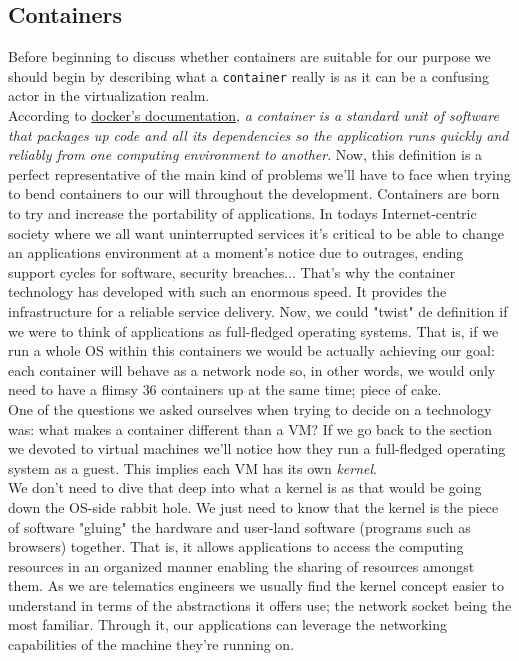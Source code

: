         \subsection{Containers}
            Before beginning to discuss whether containers are suitable for our purpose we should begin by describing what a \texttt{container} really is as it can be a confusing actor in the virtualization realm.\\

            According to \href{https://www.docker.com/resources/what-container}{docker's documentation}, \textit{a container is a standard unit of software that packages up code and all its dependencies so the application runs quickly and reliably from one computing environment to another}. Now, this definition is a perfect representative of the main kind of problems we'll have to face when trying to bend containers to our will throughout the development. Containers are born to try and increase the portability of applications. In todays Internet-centric society where we all want uninterrupted services it's critical to be able to change an applications environment at a moment's notice due to outrages, ending support cycles for software, security breaches... That's why the container technology has developed with such an enormous speed. It provides the infrastructure for a reliable service delivery. Now, we could "twist" de definition if we were to think of applications as full-fledged operating systems. That is, if we run a whole OS within this containers we would be actually achieving our goal: each container will behave as a network node so, in other words, we would only need to have a flimsy $36$ containers up at the same time; piece of cake.\\

            One of the questions we asked ourselves when trying to decide on a technology was: what makes a container different than a VM? If we go back to the section we devoted to virtual machines we'll notice how they run a full-fledged operating system as a guest. This implies each VM has its own \textit{kernel}.\\

            We don't need to dive that deep into what a kernel is as that would be going down the OS-side rabbit hole. We just need to know that the kernel is the piece of software "gluing" the hardware and user-land software (programs such as browsers) together. That is, it allows applications to access the computing resources in an organized manner enabling the sharing of resources amongst them. As we are telematics engineers we usually find the kernel concept easier to understand in terms of the abstractions it offers use; the network socket being the most familiar. Through it, our applications can leverage the networking capabilities of the machine they're running on.\\

